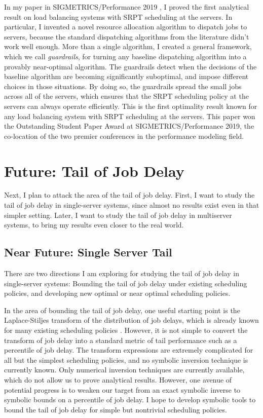 \documentclass[11pt]{article}
\begin{document}
In my paper in SIGMETRICS/Performance 2019 \cite{Grosof:2019:LBG:3341617.3326157},
I proved the first analytical result on load balancing systems with SRPT scheduling at the servers.
In particular, I invented a novel resource allocation algorithm to dispatch jobs to servers,
because the standard dispatching algorithms from the literature didn't work well enough.
More than a single algorithm,
I created a general framework, which we call \textit{guardrails},
for turning any baseline dispatching algorithm
into a provably near-optimal algorithm.
The guardrails detect when the decisions of the baseline algorithm
are becoming significantly suboptimal,
and impose different choices in those situations.
By doing so, the guardrails spread the small jobs across all of the servers,
which ensures that the SRPT scheduling policy at the servers can always operate efficiently.
This is the first optimality result known for any load balancing system
with SRPT scheduling at the servers.
This paper won the Outstanding Student Paper Award at SIGMETRICS/Performance 2019,
the co-location of the two premier conferences in the performance modeling field.

\section{Future: Tail of Job Delay}
Next, I plan to attack the area of the tail of job delay.
First, I want to study the tail of job delay in single-server systems,
since almost no results exist even in that simpler setting.
Later, I want to study the tail of job delay in multiserver systems,
to bring my results even closer to the real world.

\subsection{Near Future: Single Server Tail}
There are two directions I am exploring for studying the tail of job delay in single-server systems: Bounding the tail of job delay under existing scheduling policies, and developing new optimal or near optimal scheduling policies.

In the area of bounding the tail of job delay,
one useful starting point is the Laplace-Stiljes transform
of the distribution of job delays,
which is already known for many existing scheduling policies \cite{Scully:2018:SOC:3203302.3179419}.
However, it is not simple to convert the transform of job delay
into a standard metric of tail performance such as a percentile of job delay.
The transform expressions are extremely complicated for all but the simplest scheduling policies,
and no symbolic inversion technique is currently known.
Only numerical inversion techniques are currently available,
which do not allow us to prove analytical results.
However, one avenue of potential progress is to weaken our target
from an exact symbolic inverse to symbolic bounds on a percentile of job delay.
I hope to develop symbolic tools to bound the tail of job delay
for simple but nontrivial scheduling policies.
\end{document}
